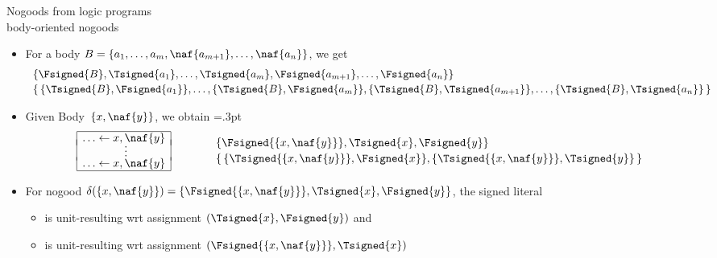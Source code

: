 \begin{frame}{Nogoods from logic programs\\[-1ex]\normalsize body-oriented nogoods}
  \begin{itemize}
  \item <1> For a body $B=\{a_1,\dots,a_m,\naf{a_{m+1}},\dots,\naf{a_n}\}$, %
    we get
    \vspace{-2pt}
    \[
    \begin{array}{l}
      \{\Fsigned{B},\Tsigned{a_1},\dots,\Tsigned{a_m},\Fsigned{a_{m+1}},\dots,\Fsigned{a_n}\}
      \\[2pt]
      \{\,
      \{\Tsigned{B},\Fsigned{a_1}\},
      \dots,
      \{\Tsigned{B},\Fsigned{a_m}\},
      \{\Tsigned{B},\Tsigned{a_{m+1}}\},
      \dots,
      \{\Tsigned{B},\Tsigned{a_n}\}
      \,\}
    \end{array}
  \]
  \item<2-> 
    Given Body~$\{x,\naf{y}\}$, we obtain
    \arrayrulewidth=.3pt
    \[
    \begin{array}{@{}|r@{}l|}
      \hline
      \ldots\leftarrow{}&x,\naf{y}\\[-1.2ex]
      &\quad\vdots\\[-3pt]
      \ldots\leftarrow{}&x,\naf{y}\\
      \hline
    \end{array}
    \quad\quad
    \begin{array}{p{5pt}l}
      &\{\Fsigned{\{x,\naf{y}\}},\Tsigned{x},\Fsigned{y}\}
      \\[2pt]
      &\{\,\{\Tsigned{\{x,\naf{y}\}},\Fsigned{x}\},\{\Tsigned{\{x,\naf{y}\}},\Tsigned{y}\}\,\}
    \end{array}
    \]
  \item<3-> []
    For nogood $\clno{\{x,\naf{y}\}}=\{\Fsigned{\{x,\naf{y}\}},\Tsigned{x},\Fsigned{y}\}$,
    the signed literal
    \begin{itemize}
    \item {} is unit-resulting  wrt assignment $(\Tsigned{x},\Fsigned{y})$
      and
    \item {}                    is unit-resulting  wrt assignment $(\Fsigned{\{x,\naf{y}\}},\Tsigned{x})$
    \end{itemize}
  \end{itemize}
\end{frame}
